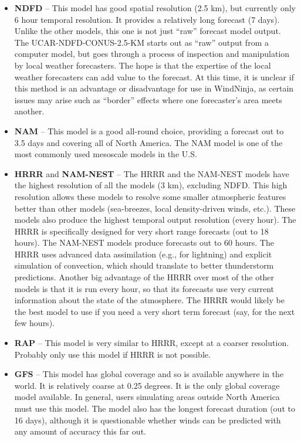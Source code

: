 \documentclass[12pt]{article}
\begin{document}
\begin{itemize}
\item \textbf{NDFD} -- This model has good spatial resolution (2.5 km), but currently only 6 hour temporal resolution.  
It provides a relatively long forecast (7 days).  
Unlike the other models, this one is not just “raw” forecast model output.  
The UCAR-NDFD-CONUS-2.5-KM starts out as “raw” output from a computer model, but goes through a process of inspection and manipulation by local weather forecasters.  
The hope is that the expertise of the local weather forecasters can add value to the forecast.  
At this time, it is unclear if this method is an advantage or disadvantage for use in WindNinja, as certain issues may arise such as “border” effects where one forecaster's area meets another.

\item \textbf{NAM} -- This model is a good all-round choice, providing a forecast out to 3.5 days and covering all of North America.  
The NAM model is one of the most commonly used mesoscale models in the U.S.

\item \textbf{HRRR} and \textbf{NAM-NEST} -- The HRRR and the NAM-NEST models have the highest resolution of all the models (3 km), excluding NDFD. This high resolution allows these models to resolve some smaller atmospheric features better than other models (sea-breezes, local density-driven winds, etc.). 
These models also produce the highest temporal output resolution (every hour). The HRRR is specifically designed for very short range forecasts (out to 18 hours). 
The NAM-NEST models produce forecasts out to 60 hours. 
The HRRR uses advanced data assimilation (e.g., for lightning) and explicit simulation of convection, which should translate to better thunderstorm predictions. 
Another big advantage of the HRRR over most of the other models is that it is run every hour, so that its forecasts use very current information about the state of the atmosphere.  
The HRRR would likely be the best model to use if you need a very short term forecast (say, for the next few hours).

\item \textbf{RAP} -- This model is very similar to HRRR, except at a coarser resolution.  
Probably only use this model if HRRR is not possible.

\item \textbf{GFS} -- This model has global coverage and so is available anywhere in the world.  
It is relatively coarse at 0.25 degrees.  It is the only global coverage model available.  
In general, users simulating areas outside North America must use this model.  
The model also has the longest forecast duration (out to 16 days), although it is questionable whether winds can be predicted with any amount of accuracy this far out.
\end{itemize}
\end{document}
